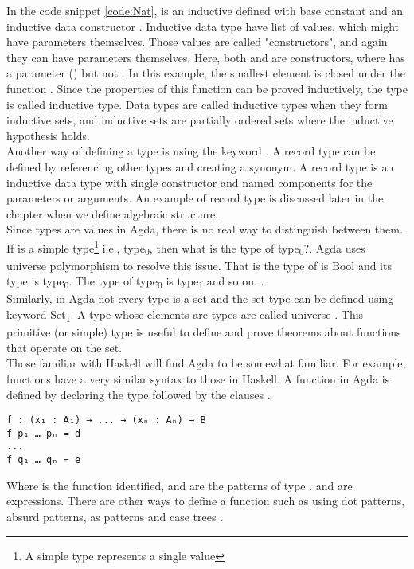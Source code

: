 In the code snippet \ref{code:Nat},  is an inductive defined with
base constant  and an inductive data constructor .
Inductive data type have list of values, which might have parameters themselves.
Those values are called "constructors", and again they can have parameters
themselves. Here, both  and  are constructors, where
 has a parameter () but not . In this
example, the smallest element  is closed under the function
. Since the properties of this function can be proved inductively,
the type is called inductive type. Data types are called inductive types when
they form inductive sets, and inductive sets are partially ordered sets
\cite{enwiki:1142884446} where the inductive hypothesis
holds\cite{enwiki:1127496533}. \\
Another way of defining a type is using the keyword . A record
type can be defined by referencing other types and creating a synonym. A record
type is an inductive data type with single constructor and named components for
the parameters or arguments. An example of record type is discussed later in the
chapter when we define algebraic structure.\\
Since types are values in Agda, there is no real way to distinguish between
them. If  is a simple type\footnote{A simple type represents a
single value} i.e., type\textsubscript{0}, then what is the type of
type\textsubscript{0}?. Agda uses universe polymorphism to resolve this issue.
That is the type of  is Bool and its type is type\textsubscript{0}.
The type of type\textsubscript{0} is type\textsubscript{1} and so on.
\cite{kidney2020finiteness}.\\
Similarly, in Agda not every type is a set and the set type can be defined using
keyword Set\textsubscript{1}. A type whose elements are types are called
universe \cite{universeagda}. This primitive (or simple) type is useful to
define and prove theorems about functions that operate on the set.\\

Those familiar with Haskell will find Agda to be somewhat familiar. For example,
functions have a very similar syntax to those in Haskell. A function in Agda is
defined by declaring the type followed by the clauses \cite{agdaFunction}. 
\begin{verbatim}
f : (x₁ : A₁) → ... → (xₙ : Aₙ) → B
f p₁ … pₙ = d
...
f q₁ … qₙ = e
\end{verbatim} 
Where  is the function identified,  and  are the
patterns of type .  and  are expressions. There
are other ways to define a function such as using dot patterns, absurd patterns,
as patterns and case trees \cite{agdaFunction}.\\

